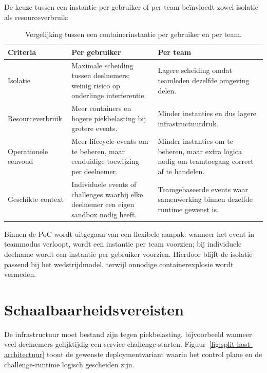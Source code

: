 De keuze tussen een instantie per gebruiker of per team beïnvloedt zowel isolatie als resourceverbruik:

\begin{table}[htbp]
  \centering
  \caption[Vergelijking tussen container per gebruiker en per team]{Vergelijking tussen een containerinstantie per gebruiker en per team.}
  \label{tab:granulariteit}
  \begin{tabularx}{\textwidth}{@{}lXX@{}}
    \toprule
    \textbf{Criteria} & \textbf{Per gebruiker} & \textbf{Per team} \\
    \midrule
    Isolatie & Maximale scheiding tussen deelnemers; weinig risico op onderlinge interferentie. & Lagere scheiding omdat teamleden dezelfde omgeving delen. \\
    Resourceverbruik & Meer containers en hogere piekbelasting bij grotere events. & Minder instanties en dus lagere infrastructuurdruk. \\
    Operationele eenvoud & Meer lifecycle-events om te beheren, maar eenduidige toewijzing per deelnemer. & Minder instanties om te beheren, maar extra logica nodig om teamtoegang correct af te handelen. \\
    Geschikte context & Individuele events of challenges waarbij elke deelnemer een eigen sandbox nodig heeft. & Teamgebaseerde events waar samenwerking binnen dezelfde runtime gewenst is. \\
    \bottomrule
  \end{tabularx}
\end{table}

Binnen de PoC wordt uitgegaan van een flexibele aanpak: wanneer het event in teammodus verloopt, wordt een instantie per team voorzien; bij individuele deelname wordt een instantie per gebruiker voorzien. Hierdoor blijft de isolatie passend bij het wedstrijdmodel, terwijl onnodige containerexplosie wordt vermeden.

\section{Schaalbaarheidsvereisten}%
\label{sec:tobe-schaalbaarheid}

De infrastructuur moet bestand zijn tegen piekbelasting, bijvoorbeeld wanneer veel deelnemers gelijktijdig een service-challenge starten. Figuur~\ref{fig:split-host-architectuur} toont de gewenste deploymentvariant waarin het control plane en de challenge-runtime logisch gescheiden zijn.

